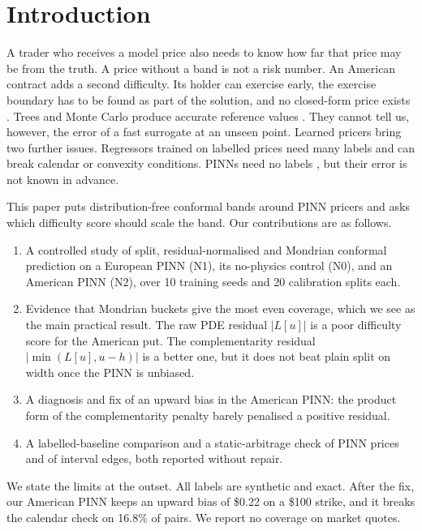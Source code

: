 \documentclass[conference]{IEEEtran}
\newcommand{\usd}{\$}
\begin{document}
\section{Introduction}
A trader who receives a model price also needs to know how far that price may be from the truth. A price without a band is not a risk number. An American contract adds a second difficulty. Its holder can exercise early, the exercise boundary has to be found as part of the solution, and no closed-form price exists \cite{merton1973theory,hull2022options}. Trees and Monte Carlo produce accurate reference values \cite{cox1979option,longstaff2001valuing}. They cannot tell us, however, the error of a fast surrogate at an unseen point. Learned pricers bring two further issues. Regressors trained on labelled prices need many labels and can break calendar or convexity conditions. PINNs need no labels \cite{raissi2019physics}, but their error is not known in advance.

This paper puts distribution-free conformal bands \cite{vovk2005algorithmic,lei2018distribution} around PINN pricers and asks which difficulty score should scale the band. Our contributions are as follows.
\begin{enumerate}
\item A controlled study of split, residual-normalised and Mondrian conformal prediction on a European PINN (N1), its no-physics control (N0), and an American PINN (N2), over 10 training seeds and 20 calibration splits each.
\item Evidence that Mondrian buckets give the most even coverage, which we see as the main practical result. The raw PDE residual $|L[u]|$ is a poor difficulty score for the American put. The complementarity residual $|\min(L[u],u-h)|$ is a better one, but it does not beat plain split on width once the PINN is unbiased.
\item A diagnosis and fix of an upward bias in the American PINN: the product form of the complementarity penalty barely penalised a positive residual.
\item A labelled-baseline comparison and a static-arbitrage check of PINN prices and of interval edges, both reported without repair.
\end{enumerate}
We state the limits at the outset. All labels are synthetic and exact. After the fix, our American PINN keeps an upward bias of \usd 0.22 on a \usd 100 strike, and it breaks the calendar check on 16.8\% of pairs. We report no coverage on market quotes.
\end{document}

